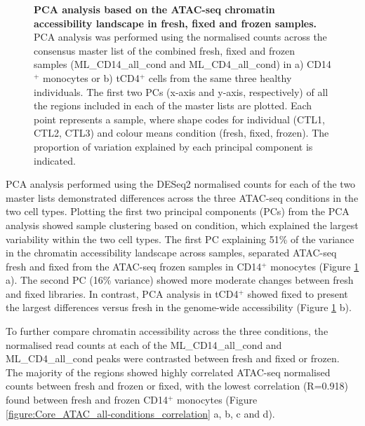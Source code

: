 \begin{figure}[htbp]
\begin{subfigure}{0.5\textwidth}
\caption{\textbf{}}
\end{subfigure}
\caption[PCA analysis based on the ATAC-seq chromatin accessibility landscape in fresh, fixed and frozen samples.]{\textbf{PCA analysis based on the ATAC-seq chromatin accessibility landscape in fresh, fixed and frozen samples.} PCA analysis was performed using the normalised counts across the consensus master list of the combined fresh, fixed and frozen samples (ML\_CD14\_all\_cond and ML\_CD4\_all\_cond) in a) CD14$^+$ monocytes or b) tCD4$^+$ cells from the same three healthy individuals. The first two PCs (x-axis and y-axis, respectively) of all the regions included in each of the master lists are plotted. Each point represents a sample, where shape codes for individual (CTL1, CTL2, CTL3) and colour means condition (fresh, fixed, frozen). The proportion of variation explained by each principal component is indicated.}
\label{figure:Core_ATAC_all_conditions_PCA}
\end{figure}



PCA analysis performed using the DESeq2 normalised counts for each of the two master lists demonstrated differences across the three ATAC-seq conditions in the two cell types. Plotting the first two principal components (PCs) from the PCA analysis showed sample clustering based on condition, which explained the largest variability within the two cell types. The first PC explaining 51\% of the variance in the chromatin accessibility landscape across samples, separated ATAC-seq fresh and fixed from the ATAC-seq frozen samples in CD14$^+$ monocytes (Figure \ref{figure:Core_ATAC_all_conditions_PCA} a). The second PC (16\% variance) showed more moderate changes between fresh and fixed libraries. In contrast, PCA analysis in tCD4$^+$ showed fixed to present the largest differences versus fresh in the genome-wide accessibility (Figure \ref{figure:Core_ATAC_all_conditions_PCA} b). 


To further compare chromatin accessibility across the three conditions, the normalised read counts at each of the ML\_CD14\_all\_cond and ML\_CD4\_all\_cond peaks were contrasted between fresh and fixed or frozen. The majority of the regions showed highly correlated ATAC-seq normalised counts between fresh and frozen or fixed, with the lowest correlation (R=0.918) found between fresh and frozen CD14$^+$ monocytes (Figure \ref{figure:Core_ATAC_all-conditions_correlation} a, b, c and d). 


